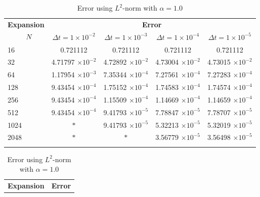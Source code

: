 	\begin{table}[H]
		\begin{tabular}{lcccc}
			\toprule
			\multicolumn{1}{c}{\textbf{Expansion}} & \multicolumn{4}{c}{\textbf{Error}} \\
			$\hspace{9mm}N$ & $\Delta t=1\times 10^{-2}$ & $\Delta t=1\times 10^{-3}$ & $\Delta t=1\times 10^{-4}$ & $\Delta t=1\times 10^{-5}$ \\
			\midrule
			\hspace{7mm} 16 & 0.721112    & 0.721112    & 0.721112    & 0.721112    \\
			\midrule
			\hspace{7mm} 32 & 4.71797 $\times 10^{-2}$   & 4.72892 $\times 10^{-2}$   & 4.73004 $\times 10^{-2}$   & 4.73015 $\times 10^{-2}$   \\
			\midrule
			\hspace{7mm} 64 & 1.17954 $\times 10^{-3}$  & 7.35344 $\times 10^{-4}$ & 7.27561 $\times 10^{-4}$ & 7.27283 $\times 10^{-4}$  \\
			\midrule
			\hspace{7mm} 128 & 9.43454 $\times 10^{-4}$ & 1.75152 $\times 10^{-4}$ & 1.74583 $\times 10^{-4}$ & 1.74574 $\times 10^{-4}$ \\
			\midrule
			\hspace{7mm} 256 & 9.43454 $\times 10^{-4}$ & 1.15509 $\times 10^{-4}$ & 1.14669 $\times 10^{-4}$ & 1.14659 $\times 10^{-4}$ \\
			\midrule
			\hspace{7mm} 512 & 9.43454 $\times 10^{-4}$ & 9.41793 $\times 10^{-5}$ & 7.78847 $\times 10^{-5}$ & 7.78707 $\times 10^{-5}$ \\
			\midrule
			\hspace{7mm} 1024 & $\ast$         & 9.41793 $\times 10^{-5}$ & 5.32213 $\times 10^{-5}$ & 5.32019 $\times 10^{-5}$ \\
			\midrule
			\hspace{7mm} 2048 & $\ast$           & $\ast$           & 3.56779 $\times 10^{-5}$ & 3.56498 $\times 10^{-5}$ \\
			\\
			\bottomrule
		\end{tabular}
		\caption{Error using $L^2$-norm with $\alpha=1.0$}
		\label{Collocation_tabla_L2_alpha=1}
		\vspace{1cm}
		\begin{tabular}{lcccc}
			\toprule
			\multicolumn{1}{c}{\textbf{Expansion}} & \multicolumn{4}{c}{\textbf{Error}} \\

\end{tabular}
\end{table}
